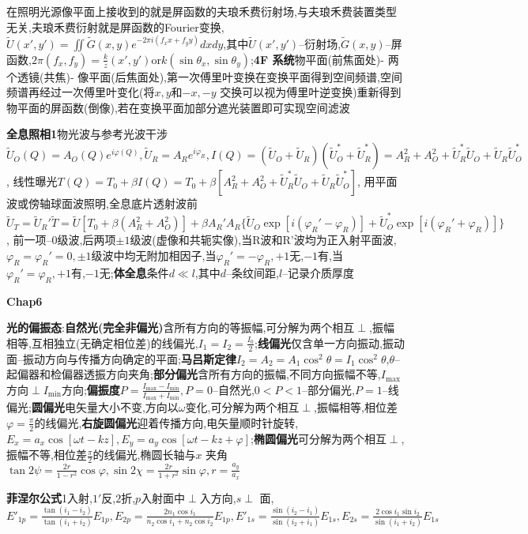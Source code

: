 \documentclass[10pt,a4paper]{article}
\begin{document}
在照明光源像平面上接收到的就是屏函数的夫琅禾费衍射场,与夫琅禾费装置类型无关,夫琅禾费衍射就是屏函数的Fourier变换,$\widetilde{U}(x',y')=\iint\widetilde{G}(x,y)e^{-2\pi i(f_xx+f_yy)}dxdy$,其中$\widetilde{U}(x',y')$--衍射场,$\widetilde{G}(x,y)$--屏函数,$2\pi(f_x,f_y)=\frac{k}{z}(x',y')\text{or}k(\sin\theta_x,\sin\theta_y)$;\textbf{4F 系统}物平面(前焦面处)- 两个透镜(共焦)- 像平面(后焦面处),第一次傅里叶变换在变换平面得到空间频谱,空间频谱再经过一次傅里叶变化(将$x,y$和$-x,-y$ 交换可以视为傅里叶逆变换)重新得到物平面的屏函数(倒像),若在变换平面加部分遮光装置即可实现空间滤波

\textbf{全息照相1}物光波与参考光波干涉$\widetilde{U}_O(Q)=A_O(Q)e^{i\varphi(Q)},\widetilde{U}_R=A_Re^{i\varphi_R},I(Q)=(\widetilde{U}_O+\widetilde{U}_R)(\widetilde{U}_O^*+\widetilde{U}_R^*)=A_R^2+A_O^2+\widetilde{U}_R^*\widetilde{U}_O+\widetilde{U}_R\widetilde{U}_O^*$, 线性曝光$T(Q)=T_0+\beta I(Q)=T_0+\beta[A_R^2+A_O^2+\widetilde{U}_R^*\widetilde{U}_O+\widetilde{U}_R\widetilde{U}_O^*]$, 用平面波或傍轴球面波照明,全息底片透射波前$\widetilde{U}_T=\widetilde{U}_R'\widetilde{T}=\widetilde{U}[T_0+\beta(A_R^2+A_O^2)]+\beta A_R'A_R\{\widetilde{U}_O\exp[i(\varphi_R'-\varphi_R)]+\widetilde{U}_O^*\exp[i(\varphi_R'+\varphi_R)]\}$, 前一项--$0$级波,后两项$\pm1$级波(虚像和共轭实像),当R波和R’波均为正入射平面波,$\varphi_R=\varphi_R'=0,\pm1$级波中均无附加相因子,当$\varphi_R'=-\varphi_R,+1$无,$-1$有,当$\varphi_R'=\varphi_R,+1$有,$-1$无;\textbf{体全息}条件$d\ll l$,其中$d$--条纹间距,$l$--记录介质厚度

\textbf{Chap6}

\textbf{光的偏振态}:\textbf{自然光(完全非偏光)}含所有方向的等振幅,可分解为两个相互$\perp$,振幅相等,互相独立(无确定相位差)的线偏光,$I_1=I_2=\frac{I_0}{2}$;\textbf{线偏光}仅含单一方向振动,振动面--振动方向与传播方向确定的平面;\textbf{马吕斯定律}$I_2=A_2=A_1\cos^2\theta=I_1\cos^2\theta$,$\theta$--起偏器和检偏器透振方向夹角;\textbf{部分偏光}含所有方向的振幅,不同方向振幅不等,$I_{\max}$ 方向$\perp I_{\min}$方向;\textbf{偏振度}$P=\frac{I_{\max}-I_{\min}}{I_{\max}+I_{\min}},P=0$--自然光,$0<P<1$--部分偏光,$P=1$--线偏光;\textbf{圆偏光}电矢量大小不变,方向以$\omega$变化,可分解为两个相互$\perp$,振幅相等,相位差$\varphi=\frac{\pi}{2}$的线偏光,\textbf{右旋圆偏光}迎着传播方向,电矢量顺时针旋转,$E_x=a_x\cos[\omega t-kz],E_y=a_y\cos[\omega t-kz+\varphi]$;\textbf{椭圆偏光}可分解为两个相互$\perp$,振幅不等,相位差$\frac{\pi}{2}$的线偏光,椭圆长轴与$x$ 夹角$\tan2\psi=\frac{2r}{1-r^2}\cos\varphi,\sin2\chi=\frac{2r}{1+r^2}\sin\varphi,r=\frac{a_y}{a_x}$


\textbf{菲涅尔公式}1入射,$1'$反,$2$折,$p$入射面中$\perp$入方向,$s\perp$ 面,$E'_{1p}=\frac{\tan(i_1-i_2)}{\tan(i_1+i_2)}E_{1p},E_{2p}=\frac{2n_1\cos i_1}{n_2\cos i_1+n_2\cos i_2}E_{1p},E'_{1s}=\frac{\sin(i_2-i_1)}{\sin(i_2+i_1)}E_{1s},E_{2s}=\frac{2\cos i_1\sin i_2}{\sin(i_1+i_2)}E_{1s}$
\end{document}

